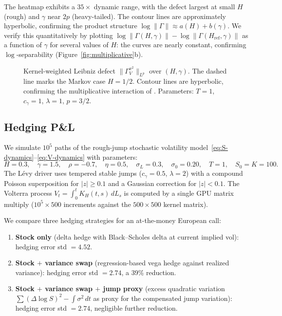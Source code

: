 \documentclass[11pt,a4paper]{article}
\theoremstyle{plain}
\theoremstyle{definition}
\theoremstyle{remark}
\begin{document}
The heatmap exhibits a $35\times$ dynamic range, with the
defect largest at small $H$ (rough) and $\gamma$ near $2p$
(heavy-tailed).  The contour lines are approximately
hyperbolic, confirming the product structure
$\log\|\Gamma\| \approx a(H) + b(\gamma)$.
We verify this quantitatively by plotting
$\log\|\Gamma(H,\gamma)\| - \log\|\Gamma(H_{\mathrm{ref}},\gamma)\|$
as a function of $\gamma$ for several values of $H$:
the curves are nearly constant, confirming
$\log$-separability (Figure~\ref{fig:multiplicative}b).

\begin{figure}[ht]
\centering
\caption{Kernel-weighted Leibniz defect
$\|\Gamma_V^{x^2}\|_{L^p}$ over
$(H, \gamma)$.  The dashed line marks the Markov case
$H = 1/2$.  Contour lines are hyperbolic, confirming
the multiplicative interaction of
.  Parameters: $T = 1$,
$c_\gamma = 1$, $\lambda = 1$, $p = 3/2$.}
\label{fig:heatmap}
\end{figure}


\subsection{Hedging P\&L}

We simulate $10^5$ paths of the rough-jump stochastic
volatility model~\eqref{eq:S-dynamics}--\eqref{eq:V-dynamics}
with parameters:
\[
  H = 0.3,\quad \gamma = 1.5,\quad \rho = -0.7,\quad
  \eta = 0.5,\quad \sigma_L = 0.3,\quad \sigma_0 = 0.20,\quad
  T = 1,\quad S_0 = K = 100.
\]
The L\'evy driver uses tempered stable jumps ($c_\gamma = 0.5$,
$\lambda = 2$) with a compound Poisson superposition for
$|z| \geq 0.1$ and a Gaussian correction for $|z| < 0.1$.
The Volterra process $V_t = \int_0^t K_H(t,s)\,dL_s$ is
computed by a single GPU matrix multiply
($10^5 \times 500$ increments against the $500 \times 500$
kernel matrix).

We compare three hedging strategies for an at-the-money
European call:

\begin{enumerate}[label=(\roman*)]
\item \textbf{Stock only} (delta hedge with Black--Scholes
  delta at current implied vol):
  hedging error std $= 4.52$.
\item \textbf{Stock $+$ variance swap} (regression-based
  vega hedge against realized variance):
  hedging error std $= 2.74$, a 39\% reduction.
\item \textbf{Stock $+$ variance swap $+$ jump proxy}
  (excess quadratic variation
  $\sum (\Delta\log S)^2 - \int \sigma^2\,dt$ as proxy
  for the compensated jump variation):
  hedging error std $= 2.74$, negligible further reduction.
\end{enumerate}
\end{document}
